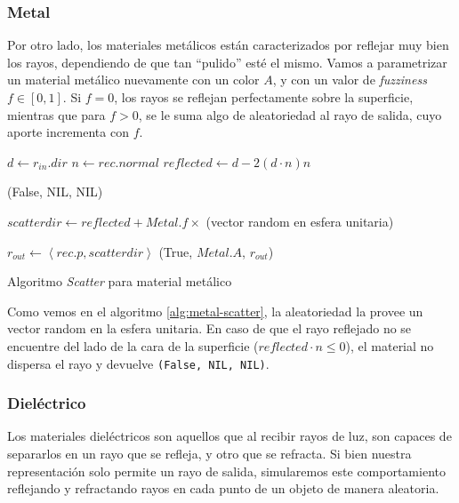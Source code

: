 \subsubsection{Metal}

Por otro lado, los materiales metálicos están caracterizados por reflejar muy
bien los rayos, dependiendo de que tan ``pulido'' esté el mismo. Vamos a
parametrizar un material metálico nuevamente con un color $A$, y con un valor de
\textit{fuzziness} $f \in [0, 1]$. Si $f=0$, los rayos se reflejan perfectamente
sobre la superficie, mientras que para $f>0$, se le suma algo de aleatoriedad al
rayo de salida, cuyo aporte incrementa con $f$.

\begin{algorithm}
  \begin{algorithmic}[1]

    \State $d \gets r_{in}.dir$
    \State $n \gets rec.normal$
    \State $reflected \gets d - 2 (d \cdot n) n $

    \State \Return (False, NIL, NIL)
    \EndIf

    \State $scatterdir \gets reflected + Metal.f \times$ (vector random en esfera
    unitaria)

    \State $r_{out} \gets \left \langle rec.p, scatterdir \right \rangle$
    \State \Return (True, $Metal.A$, $r_{out}$)
    \EndFunction
  \end{algorithmic}
  \caption{Algoritmo \textit{Scatter} para material metálico}
  \label{alg:metal-scatter}
\end{algorithm}

Como vemos en el algoritmo \ref{alg:metal-scatter}, la aleatoriedad la provee un
vector random en la esfera unitaria. En caso de que el rayo reflejado no se
encuentre del lado de la cara de la superficie ($reflected \cdot n \le 0$), el
material no dispersa el rayo y devuelve \texttt{(False, NIL, NIL)}.

\subsubsection{Dieléctrico}

Los materiales dieléctricos son aquellos que al recibir rayos de luz, son
capaces de separarlos en un rayo que se refleja, y otro que se refracta. Si bien
nuestra representación solo permite un rayo de salida, simularemos este
comportamiento reflejando y refractando rayos en cada punto de un objeto de
manera aleatoria.

